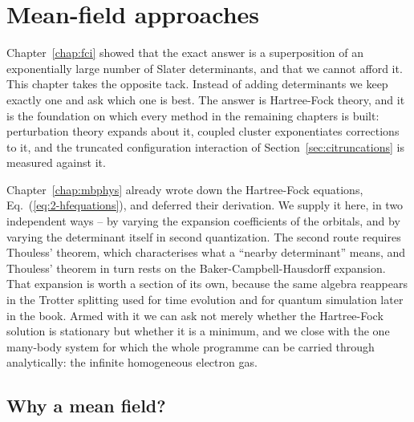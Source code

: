 \chapter{Mean-field approaches}
\label{chap:hartrefock}

Chapter~\ref{chap:fci} showed that the exact answer is a superposition of an
exponentially large number of Slater determinants, and that we cannot afford
it.  This chapter takes the opposite tack.  Instead of adding determinants we
keep exactly one and ask which one is best.  The answer is Hartree-Fock
theory, and it is the foundation on which every method in the remaining
chapters is built: perturbation theory expands about it, coupled cluster
exponentiates corrections to it, and the truncated configuration interaction
of Section~\ref{sec:citruncations} is measured against it.

Chapter~\ref{chap:mbphys} already wrote down the Hartree-Fock equations,
Eq.~(\ref{eq:2-hfequations}), and deferred their derivation.  We supply it
here, in two independent ways -- by varying the expansion coefficients of the
orbitals, and by varying the determinant itself in second quantization.  The
second route requires Thouless' theorem, which characterises what a
``nearby determinant'' means, and Thouless' theorem in turn rests on the
Baker-Campbell-Hausdorff expansion.  That expansion is worth a section of its
own, because the same algebra reappears in the Trotter splitting used for time
evolution and for quantum simulation later in the book.  Armed with it we can
ask not merely whether the Hartree-Fock solution is stationary but whether it
is a minimum, and we close with the one many-body system for which the whole
programme can be carried through analytically: the infinite homogeneous
electron gas.

\section{Why a mean field?}
\label{sec:whyhf}

